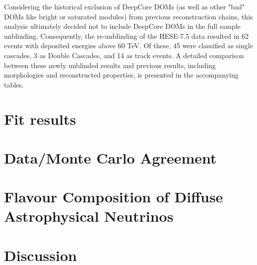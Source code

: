 Considering the historical exclusion of DeepCore DOMs (as well as other "bad" DOMs like bright or saturated modules) from previous reconstruction chains, this analysis ultimately decided not to include DeepCore DOMs in the full sample unblinding. Consequently, the re-unblinding of the HESE-7.5 data resulted in 62 events with deposited energies above 60 TeV. Of these, 45 were classified as single cascades, 3 as Double Cascades, and 14 as track events. A detailed comparison between these newly unblinded results and previous results, including morphologies and reconstructed properties, is presented in the accompanying tables.



\section{Fit results}
\label{sec:HESE12}

\section{Data/Monte Carlo Agreement}
\label{sec:data_mc}

\section{Flavour Composition of Diffuse Astrophysical Neutrinos}
\label{sec:flavour_results}

\section{Discussion}
\label{sec:results_discussion}